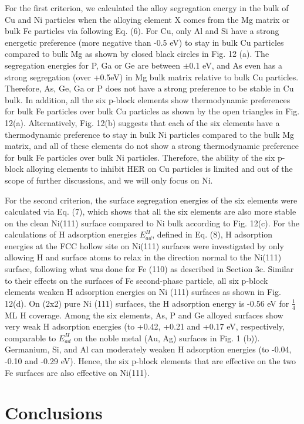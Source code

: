 For the first criterion, we calculated the alloy segregation energy in the bulk of Cu and Ni particles when the alloying element X comes from the Mg matrix or bulk Fe particles via following Eq. (6). For Cu, only Al and Si have a strong energetic preference (more negative than -0.5 eV) to stay in bulk Cu particles compared to bulk Mg as shown by closed black circles in Fig. 12 (a). The segregation energies for P, Ga or Ge are between $\pm$0.1 eV, and As even has a strong segregation (over +0.5eV) in Mg bulk matrix relative to bulk Cu particles.  Therefore, As, Ge, Ga or P does not have a strong preference to be stable in Cu bulk. In addition, all the six p-block elements show thermodynamic preferences for bulk Fe particles over bulk Cu particles as shown by the open triangles in Fig. 12(a). Alternatively, Fig. 12(b) suggests that each of the six elements have a thermodynamic preference to stay in bulk Ni particles compared to the bulk Mg matrix, and all of these elements do not show a strong thermodynamic preference for bulk Fe particles over bulk Ni particles. Therefore, the ability of the six p-block alloying elements to inhibit HER on Cu particles is limited and out of the scope of further discussions, and we will only focus on Ni.

For the second criterion, the surface segregation energies of the six elements were calculated via Eq. (7), which shows that all the six elements are also more stable on the clean Ni(111) surface compared to Ni bulk according to Fig. 12(c). For the calculations of H adsorption energies $E_{ad}^H$, defined in Eq. (8), H adsorption energies at the FCC hollow site on Ni(111) surfaces were investigated by only allowing H and surface atoms to relax in the direction normal to the Ni(111) surface, following what was done for Fe (110) as described in Section 3c. Similar to their effects on the surfaces of Fe second-phase particle, all six p-block elements weaken H adsorption energies on Ni (111) surfaces as shown in Fig. 12(d). On (2x2) pure Ni (111) surfaces, the H adsorption energy is -0.56 eV for $\frac{1}{4}$ ML H coverage. Among the six elements, As, P and Ge alloyed surfaces show very weak H adsorption energies (to +0.42, +0.21 and +0.17 eV, respectively, comparable to $E_{ad}^H$ on the noble metal (Au, Ag) surfaces in Fig. 1 (b)). Germanium, Si, and Al can moderately weaken H adsorption energies (to -0.04, -0.10 and -0.29 eV). Hence, the six p-block elements that are effective on the two Fe surfaces are also effective on Ni(111).

\section{Conclusions}

